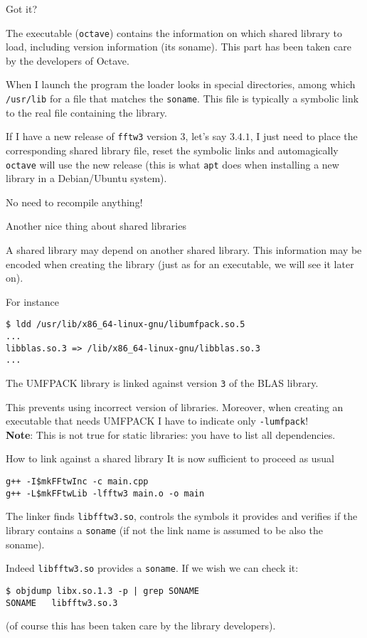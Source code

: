 \documentclass[10pt]{beamer}
\begin{document}
\begin{frame}{Got it?}  

The executable (\texttt{octave}) contains the
information on which shared library to load, including version
information (its soname). This part has been taken care by the 
developers of Octave.
\smallskip

When I launch the program the loader looks in special directories,
among which \texttt{/usr/lib} for a file that matches the
\texttt{soname}. This file is typically a symbolic link to the real
file containing the library.  
\medskip

If I have a new release of \texttt{fftw3} version 3, let's say $3.4.1$,
I just need to place the corresponding shared library file, reset the symbolic links and automagically \texttt{octave}
will use the new release (this is what \texttt{apt} does when
installing a new library in a Debian/Ubuntu system).

\smallskip

No need to recompile anything!
\end{frame}


\begin{frame}[fragile]{Another nice thing about shared libraries} 

A shared library may depend on another shared library. This information may be encoded  when creating the library
(just as for an executable, we will see it later on).

For instance
\begin{verbatim}
$ ldd /usr/lib/x86_64-linux-gnu/libumfpack.so.5
...
libblas.so.3 => /lib/x86_64-linux-gnu/libblas.so.3
...
\end{verbatim}
The UMFPACK library is linked against version
\texttt{3} of the BLAS library. \smallskip

This prevents using incorrect version of
libraries. Moreover, when creating an executable that needs UMFPACK I have to indicate only
\texttt{-lumfpack}! \\
\textbf{Note}: This is not true for static libraries: you have to list all dependencies.
\end{frame}

\begin{frame}[fragile]{How to link against a shared library}   
It is now sufficient to proceed as usual
\begin{verbatim}
g++ -I$mkFFtwInc -c main.cpp
g++ -L$mkFFtwLib -lfftw3 main.o -o main
\end{verbatim}

The linker finds \texttt{libfftw3.so}, controls the symbols it
provides and verifies if the library contains a
\texttt{soname} (if not the link name is assumed to be also the
soname).

Indeed \texttt{libfftw3.so} provides a \texttt{soname}. If we wish we
can check it:
\begin{verbatim}
$ objdump libx.so.1.3 -p | grep SONAME
SONAME   libfftw3.so.3
\end{verbatim}
(of course this has been taken care by the library developers).
\end{frame}
\end{document}
